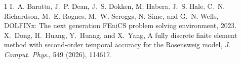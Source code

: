 \documentclass[10pt,a4paper]{article}
\begin{document}
\setcounter{section}{5}

\begin{thebibliography}{1}
I.~A. Baratta, J.~P. Dean, J.~S. Dokken, M. Habera, J.~S. Hale,
C.~N. Richardson, M.~E. Rognes, M.~W. Scroggs, N. Sime, and G.~N. Wells,
DOLFINx: The next generation FEniCS problem solving environment, 2023.
X.~Dong, H.~Huang, Y.~Huang, and X.~Yang,
A fully discrete finite element method with second-order temporal
accuracy for the Rosensweig model,
\emph{J. Comput. Phys.}, 549 (2026), 114617.
\end{thebibliography}
\end{document}
